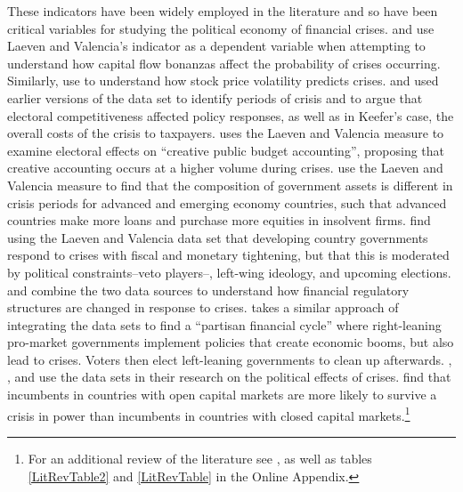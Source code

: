 \documentclass[]{article}
\begin{document}
These indicators have been widely employed in the literature and so have been critical variables for studying the political economy of financial crises. \cite{Fielding2015} and \cite{Herrera2014} use Laeven and Valencia's indicator as a dependent variable when attempting to understand how capital flow bonanzas affect the probability of crises occurring. Similarly, \cite{Danielsson2015} use \cite{Reinhart2009} to understand how stock price volatility predicts crises. \cite{Keefer2007} and \cite{Rosas2006,Rosas2009} used earlier versions of the \cite{laeven2013} data set to identify periods of crisis and to argue that electoral competitiveness affected policy responses, as well as in Keefer's case, the overall costs of the crisis to taxpayers. \cite{reischmann2015} uses the Laeven and Valencia measure to examine electoral effects on ``creative public budget accounting'', proposing that creative accounting occurs at a higher volume during crises. \cite{seiferling2015} use the Laeven and Valencia measure to find that the composition of government assets is different in crisis periods for advanced and emerging economy countries, such that advanced countries make more loans and purchase more equities in insolvent firms. \cite{ha2015} find using the Laeven and Valencia data set that developing country governments respond to crises with fiscal and monetary tightening, but that this is moderated by political constraints--veto players--, left-wing ideology, and upcoming elections. \cite{Gandrud2013,Gandrud2014} and \cite{Kleibl2013} combine the two data sources to understand how financial regulatory structures are changed in response to crises. \cite{broz2013} takes a similar approach of integrating the data sets to find a ``partisan financial cycle'' where right-leaning pro-market governments implement policies that create economic booms, but also lead to crises. Voters then elect left-leaning governments to clean up afterwards. \cite{CrespoTenorio2014}, \cite{Chwieroth2013}, and \cite{Pepinsky2012} use the data sets in their research on the political effects of crises. \cite{CrespoTenorio2014} find that incumbents in countries with open capital markets are more likely to survive a crisis in power than incumbents in countries with closed capital markets.\footnote{For an additional review of the literature see \cite[1-3]{GandrudHallerberg2015}, as well as tables \ref{LitRevTable2} and \ref{LitRevTable} in the Online Appendix.}
\end{document}
